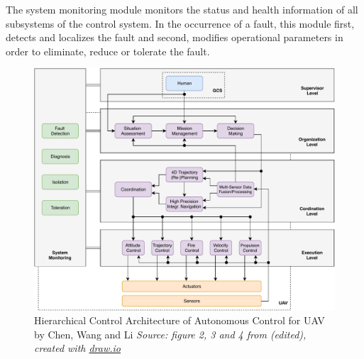 The system monitoring module monitors the status and health information of all subsystems of the control system. 
In the occurrence of a fault, this module first, detects and localizes the fault
and second, modifies operational parameters in order to eliminate, reduce or tolerate the fault.
\begin{figure}
    \centering
    \includegraphics[width=\textwidth]{Figures/draw.io/hierarchical_control_architecture_for_autonomous_UAV}
    \decoRule
    \caption[Hierarchical Control Architecture of Autonomous Control for UAV by Chen, Wang and Li]{Hierarchical Control Architecture of Autonomous Control for UAV by Chen, Wang and Li \textit{Source: figure 2, 3 and 4 from \cite{Chen2009} (edited), created with \href{https://www.draw.io/}{draw.io}}}
    \label{fig:hierarchical_control_architecture_for_autonomous_UAV}
\end{figure}








